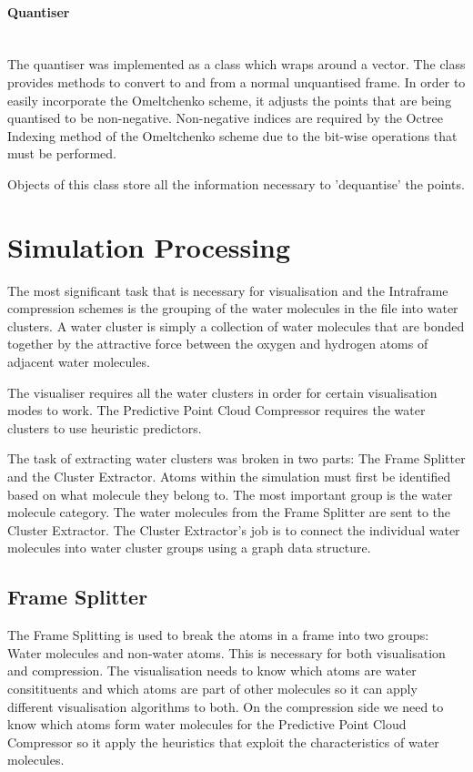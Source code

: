 \documentclass[a4paper,11pt]{report}
\begin{document}
\paragraph{Quantiser}
\ \\
The quantiser was implemented as a class which wraps around a vector. The class provides methods to convert to and from a normal unquantised frame. In order to easily incorporate the Omeltchenko scheme, it adjusts the points that are being quantised to be non-negative. Non-negative indices are required by the Octree Indexing method of the Omeltchenko scheme due to the bit-wise operations that must be performed.

Objects of this class store all the information necessary to 'dequantise' the points.

\section{Simulation Processing}

The most significant task that is necessary for visualisation and the Intraframe compression schemes is the grouping of the water molecules in the file into water clusters. A water cluster is simply a collection of water molecules that are bonded together by the attractive force between the oxygen and hydrogen atoms of adjacent water molecules. 

The visualiser requires all the water clusters in order for certain visualisation modes to work. The Predictive Point Cloud Compressor requires the water clusters to use heuristic predictors. 

The task of extracting water clusters was broken in two parts: The Frame Splitter and the Cluster Extractor. Atoms within the simulation must first be identified based on what molecule they belong to. The most important group is the water molecule category. The water molecules from the Frame Splitter are sent to the Cluster Extractor. The Cluster Extractor's job is to connect the individual water molecules into water cluster groups using a graph data structure.

\subsection{Frame Splitter}

The Frame Splitting is used to break the atoms in a frame into two groups: Water molecules and non-water atoms. This is necessary for both visualisation and compression. The visualisation needs to know which atoms are water consitituents and which atoms are part of other molecules so it can apply different visualisation algorithms to both. On the compression side we need to know which atoms form water molecules for the Predictive Point Cloud Compressor so it apply the heuristics that exploit the characteristics of water molecules.
\end{document}
